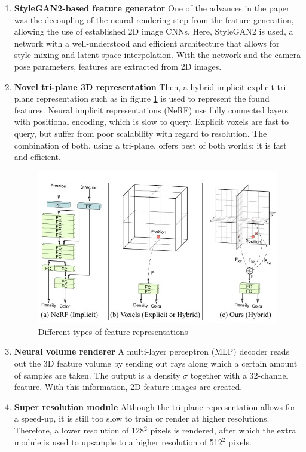 \begin{enumerate}
    \item \textbf{StyleGAN2-based feature generator}
    One of the advances in the paper was the decoupling of the neural rendering step from the feature generation, allowing the use of established 2D image CNNs. Here, StyleGAN2 is used, a network with a well-understood and efficient architecture that allows for style-mixing and latent-space interpolation. With the network and the camera pose parameters, features are extracted from 2D images.
    
    \item \textbf{Novel tri-plane 3D representation}
    Then, a hybrid implicit-explicit tri-plane representation such as in figure \ref{fig:triplane} is used to represent the found features. Neural implicit representations (NeRF) use fully connected layers with positional encoding, which is slow to query. Explicit voxels are fast to query, but suffer from poor scalability with regard to resolution. The combination of both, using a tri-plane, offers best of both worlds: it is fast and efficient. 

\begin{figure}[H]
    \centering
    \centering
    \includegraphics[width=0.5\linewidth]{triplane.jpg}
    \caption{Different types of feature representations \cite{chan2022efficient}}
    \label{fig:triplane}
\end{figure}

    \item \textbf{Neural volume renderer}
    A multi-layer perceptron (MLP) decoder reads out the 3D feature volume by sending out rays along which a certain amount of samples are taken. The output is a density $\sigma$ together with a 32-channel feature. With this information, 2D feature images are created.  
    
    \item \textbf{Super resolution module}
    Although the tri-plane representation allows for a speed-up, it is still too slow to train or render at higher resolutions. Therefore, a lower resolution of 128$^2$ pixels is rendered, after which the extra module is used to upsample to a higher resolution of 512$^2$ pixels.
    

\end{enumerate}
